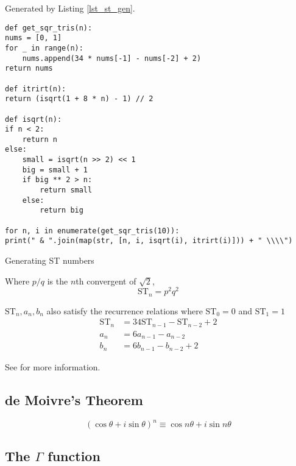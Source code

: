 Generated by Listing \ref{lst_st_gen}.

\begin{longlisting}
\begin{verbatim}
def get_sqr_tris(n):
nums = [0, 1]
for _ in range(n):
    nums.append(34 * nums[-1] - nums[-2] + 2)
return nums

def itrirt(n):
return (isqrt(1 + 8 * n) - 1) // 2

def isqrt(n):
if n < 2:
    return n
else:
    small = isqrt(n >> 2) << 1
    big = small + 1
    if big ** 2 > n:
        return small
    else:
        return big

for n, i in enumerate(get_sqr_tris(10)):
print(" & ".join(map(str, [n, i, isqrt(i), itrirt(i)])) + " \\\\")
\end{verbatim}
\caption{Generating ST numbers}\label{lst_st_gen}
\end{longlisting}


Where \(p / q\) is the \(n\)th convergent of \(\sqrt 2\),
\begin{equation}
\mathrm{ST}_n = p^2 q^2
\end{equation}

\(\mathrm{ST}_n, a_n, b_n\) also satisfy the recurrence relations where
\(\mathrm{ST}_0 = 0\) and \(\mathrm{ST}_1 = 1\)
\begin{align}
\mathrm{ST}_n &= 34\mathrm{ST}_{n - 1} - \mathrm{ST}_{n - 2} + 2\\
a_n &= 6a_{n - 1} - a_{n - 2} \\
b_n &= 6b_{n - 1} - b_{n - 2} + 2
\end{align}

See \cite{WikiSTNumbers,WolframSTNumbers} for more information.

\subsection{de Moivre's Theorem}

\begin{equation}
(\cos \theta + i \sin \theta)^n \equiv \cos n\theta + i \sin n\theta
\end{equation}

\subsection[The \(\Gamma\) function]
           {The \boldmath\(\Gamma\) function}


